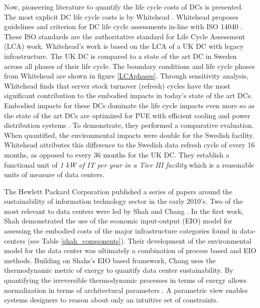     Now, pioneering literature to quantify the life cycle costs of DCs is presented. The most explicit DC life cycle costs is by Whitehead \cite{whitehead15}. Whitehead proposes guidelines and criterion for DC life cycle assessments in-line with ISO 14040 \cite{ISO14040}. These ISO standards are the authoritative standard for Life Cycle Assessment (LCA) work.  Whitehead's work is based on the LCA of a UK DC with legacy infrastructure. The UK DC is compared to a state of the art DC in Sweden across all phases of their life cycle. The boundary conditions and life cycle phases from Whitehead are shown in figure \ref{LCAphases}. Through sensitivity analysis, Whitehead finds that server stock turnover (refresh) cycles have  the most significant contribution to the embodied impacts in today's state of the art DCs.  Embodied impacts for these DCs dominate the life cycle impacts even more so as the state of the art DCs are optimized for PUE with efficient cooling and power distribution systems . To demonstrate, they performed a comparative evaluation. When quantified, the environmental impacts were double for the Swedish facility. Whitehead attributes this difference to the Swedish data refresh cycle of every 16 months, as opposed to every 36 months for the UK DC. They establish a functional unit of \textit{1 kW of IT per year in a Tier III facility} which is a reasonable units of measure of data centers.
    
    
    
    The Hewlett Packard Corporation published a series of papers around the sustainability of information technology sector in the early 2010's. Two of the most relevant to data centers were led by Shah and Chang \cite{shah11, shah12}. In the first work, Shah demonstrated the use of the economic input-output (EIO) model for assessing the embodied costs of the major infrastructure categories found in data-centers (see Table \ref{shah_components}). Their development of the environmental model for the data center was ultimately a combination of process based and EIO methods. Building on Shahs's EIO based framework, Chang uses the thermodynamic metric of exergy to quantify data center sustainability. By quantifying the irreversible thermodynamic processes in terms of exergy allows normalization in terms of architectural parameters \cite{shah12}. A parametric view enables systems designers to reason about only an intuitive set of constraints.
    
    
    
